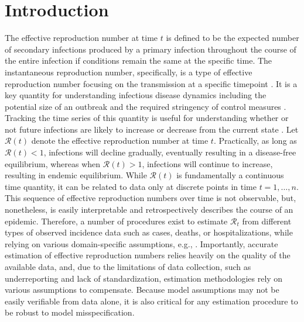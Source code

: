 \documentclass[10pt,letterpaper]{article}
\def\calR{\mathcal{R}}
\newcommand{\citep}[1]{\cite{#1}}
\begin{document}
\linenumbers

\section{Introduction}
\label{sec:intro}

The effective reproduction number at time $\textit{t}$ is defined to be the expected number of
secondary infections produced by a primary infection throughout the course of the entire infection 
if conditions remain the same at the specific time. 
The instantaneous reproduction number, specifically, is a type of effective reproduction 
number focusing on the transmission at a specific timepoint \citep{gostic2020practical}.
It is a key quantity 
for understanding infectious disease dynamics including the potential size of an
outbreak and the required stringency of control measures \citep{nishiura2009effective,fraser2007estimating}. Tracking the time
series of this quantity is useful for understanding whether or not
future infections are likely to increase or decrease from the current state \citep{anderson1991infectious}. Let
$\calR(t)$ denote the effective reproduction number at time $t$. Practically, as
long as $\calR(t) < 1$, infections will decline gradually, eventually resulting
in a disease-free equilibrium, whereas when $\calR(t) > 1$, infections will
continue to increase, resulting in endemic equilibrium. While $\calR(t)$ is
fundamentally a continuous time quantity, it can be related to data only at
discrete points in time $t = 1,\ldots,n$. This sequence of effective
reproduction numbers over time is not observable, but, nonetheless, is easily
interpretable and retrospectively describes the course of an epidemic.
Therefore, a number of procedures exist to estimate $\calR_t$ from different
types of observed incidence data such as cases, deaths, or hospitalizations,
while relying on various domain-specific assumptions, e.g., 
\cite{wallinga2004different,hao2020reconstruction,goldstein2023semiparametric,goldstein2022incorporating}. 
Importantly, accurate
estimation of effective reproduction numbers relies heavily on the quality of
the available data, and, due to the limitations of data collection, such as
underreporting and lack of standardization, estimation methodologies rely on
various assumptions to compensate. Because model assumptions may not be easily
verifiable from data alone, it is also critical for any estimation procedure to
be robust to model misspecification. 
\end{document}
